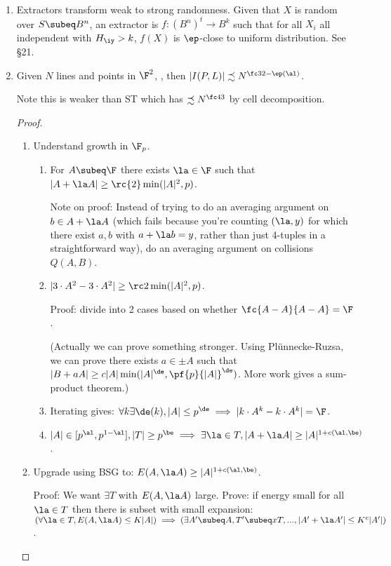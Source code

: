 \begin{enumerate}
\item
Extractors transform weak to strong randomness. 
Given that $X$ is random over $S\subeq B^n$, an extractor is $f:(B^n)^t\to B^k$ such that for all $X_i$ all independent with $H_{\iy}>k$, $f(X)$ is $\ep$-close to uniform distribution.
See \S21.

\item
\begin{thm}
Given $N$ lines and points in $\F^2$, , then $|I(P,L)|\precsim N^{\fc 32-\ep(\al)}$.
\end{thm}
Note this is weaker than ST which has $\precsim N^{\fc 43}$ by cell decomposition.
\begin{proof}
\begin{enumerate}
\item
Understand growth in $\F_p$.
\begin{enumerate}
\item
For $A\subeq \F$ there exists $\la\in \F$ such that $|A+\la A|\ge \rc{2}\min(|A|^2,p)$. 

Note on proof: Instead of trying to do an averaging argument on $b\in A+\la A$ (which fails because you're counting $(\la,y)$ for which there exist $a,b$ with $a+\la b=y$, rather than just 4-tuples in a straightforward way), do an averaging argument on collisions $Q(A,B)$.
\item
$|3\cdot A^2-3\cdot A^2|\ge \rc 2\min(|A|^2,p)$.

Proof: divide into 2 cases based on whether $\fc{A-A}{A-A}=\F$.

(Actually we can prove something stronger. Using Pl\"unnecke-Ruzsa, we can prove there exists $a\in \pm A$ such that $|B+aA|\ge c|A|\min(|A|^{\de},\pf{p}{|A|}^\de)$. More work gives a sum-product theorem.)
\item Iterating gives: $\forall k \exists \de(k), |A|\le p^{\de}\implies |k\cdot A^k-k\cdot A^k|=\F$.
\item $|A|\in [p^\al,p^{1-\al}],|T|\ge p^\be \implies \exists \la\in T, |A+\la A|\ge |A|^{1+c(\al,\be)}$.
\end{enumerate}
\item Upgrade using BSG to: $E(A,\la A)\ge |A|^{1+c(\al,\be)}$. 

Proof: We want $\exists T$ with $E(A,\la A)$ large. Prove: if energy small for all $\la\in T$ then there is subset with small expansion: $(\forall \la\in T,E(A,\la A)\le K|A|)\implies (\exists A'\subeq A,T'\subeq xT,...,|A'+\la A'|\le K^c|A'|)$.


\end{enumerate}
\end{proof}
\end{enumerate}
